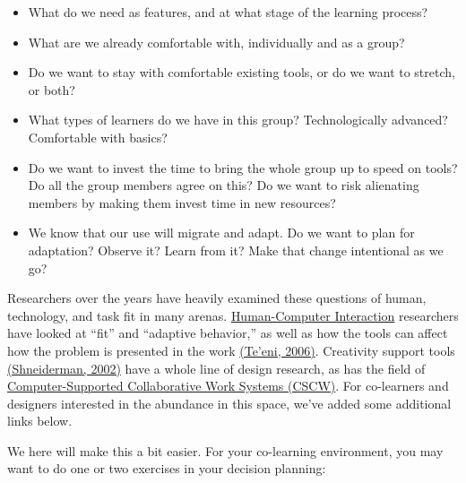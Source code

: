 \begin{itemize}
\item
  What do we need as features, and at what stage of the learning
  process?
\item
  What are we already comfortable with, individually and as a group?
\item
  Do we want to stay with comfortable existing tools, or do we want to
  stretch, or both?
\item
  What types of learners do we have in this group? Technologically
  advanced? Comfortable with basics?
\item
  Do we want to invest the time to bring the whole group up to speed on
  tools? Do all the group members agree on this? Do we want to risk
  alienating members by making them invest time in new resources?
\item
  We know that our use will migrate and adapt. Do we want to plan for
  adaptation? Observe it? Learn from it? Make that change intentional as
  we go?
\end{itemize}
Researchers over the years have heavily examined these questions of
human, technology, and task fit in many arenas.
\href{http://en.wikipedia.org/wiki/Human-Computer\_Interaction}{Human-Computer
Interaction} researchers have looked at ``fit'' and ``adaptive
behavior,'' as well as how the tools can affect how the problem is
presented in the work \href{\#teeni}{(Te'eni, 2006)}. Creativity support
tools \href{\#shneiderman}{(Shneiderman, 2002)} have a whole line of
design research, as has the field of
\href{http://en.wikipedia.org/wiki/Computer-supported\_cooperative\_work}{Computer-Supported
Collaborative Work Systems (CSCW)}. For co-learners and designers
interested in the abundance in this space, we've added some additional
links below.

We here will make this a bit easier. For your co-learning environment,
you may want to do one or two exercises in your decision planning:

